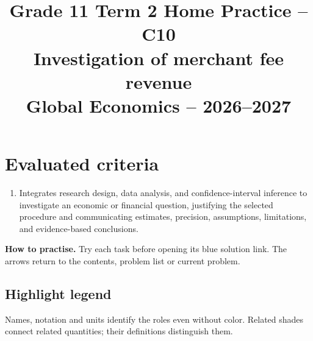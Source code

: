 \makeatletter
{}
\makeatother




\CoordinatedTermTwoPalette
\usepackage{needspace}
\usepackage{titling}
\setlength{\droptitle}{-2em}
\pretitle{\par\begingroup\centering\LARGE}
\posttitle{\par\endgroup}
\preauthor{}\postauthor{}
\predate{}\postdate{}
\maketitlehookd{\vspace{-1em}}
\linespread{1.12}
\setlength{\parskip}{5pt}

\title{Grade 11 Term 2 Home Practice -- C10\\\large Investigation of merchant fee revenue\\[0.25em]
	\normalsize Global Economics -- 2026--2027}
\author{}
\date{}


	\maketitle

	\setcounter{tocdepth}{1}
	\setcounter{secnumdepth}{2}
	\label{toc}
	\tableofcontents

	\section*{Evaluated criteria}
	\begin{enumerate}[label=\textbf{C\arabic*},start=10]
		\item Integrates research design, data analysis, and confidence-interval inference to investigate an economic or financial question, justifying the selected procedure and communicating estimates, precision, assumptions, limitations, and evidence-based conclusions.
	\end{enumerate}

	\textbf{How to practise.} Try each task before opening its blue solution link. The arrows return to the contents, problem list or current problem.


\subsection*{Highlight legend}
\label{tab:highlight-legend}
Names, notation and units identify the roles even without color. Related shades connect related quantities; their definitions distinguish them.

